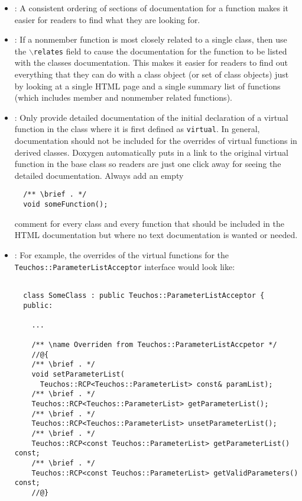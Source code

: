 \begin{itemize}
\item\DOXOrderOfDocFieds: A consistent ordering of sections of
  documentation for a function makes it easier for readers to find
  what they are looking for.


\item\DOXUseRelatesForNonmemberFunctions: If a nonmember function is
  most closely related to a single class, then use the
  \texttt{$\backslash$relates} field to cause the documentation for
  the function to be listed with the classes documentation.  This
  makes it easier for readers to find out everything that they can do
  with a class object (or set of class objects) just by looking at a
  single HTML page and a single summary list of functions (which
  includes member and nonmember related functions).


\item\DOXDocumentInitialVirtualOnly: Only provide detailed
  documentation of the initial declaration of a virtual function in
  the class where it is first defined as \texttt{virtual}.  In
  general, documentation should not be included for the overrides of
  virtual functions in derived classes.  Doxygen automatically puts in
  a link to the original virtual function in the base class so readers
  are just one click away for seeing the detailed documentation.
  Always add an empty
%
{\small\begin{verbatim}
  /** \brief . */
  void someFunction();
\end{verbatim}}
%
comment for every class and every function that should be included in the HTML
documentation but where no text documentation is wanted or needed.


\item\DOXAggregateOverrides: For example, the overrides of the virtual
  functions for the \texttt{Teuchos\-::Parameter\-List\-Acceptor}
  interface would look like:

{\small\begin{verbatim}

  class SomeClass : public Teuchos::ParameterListAcceptor {
  public:

    ...

    /** \name Overriden from Teuchos::ParameterListAccpetor */
    //@{
    /** \brief . */
    void setParameterList(
      Teuchos::RCP<Teuchos::ParameterList> const& paramList);
    /** \brief . */
    Teuchos::RCP<Teuchos::ParameterList> getParameterList();
    /** \brief . */
    Teuchos::RCP<Teuchos::ParameterList> unsetParameterList();
    /** \brief . */
    Teuchos::RCP<const Teuchos::ParameterList> getParameterList() const;
    /** \brief . */
    Teuchos::RCP<const Teuchos::ParameterList> getValidParameters() const;
    //@}


\end{verbatim}}
\end{itemize}
